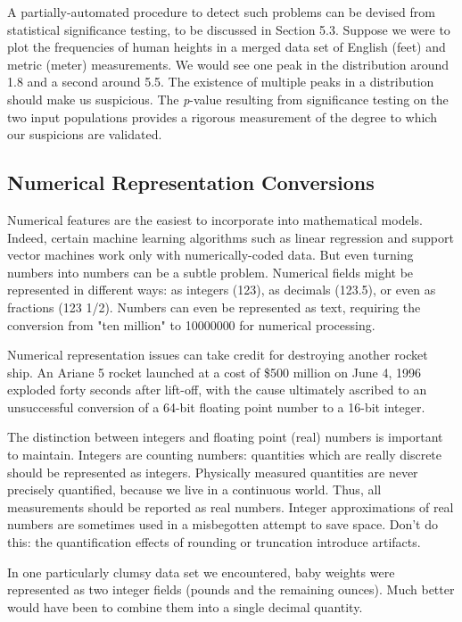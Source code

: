 \documentclass[10pt]{article}
\begin{document}
A partially-automated procedure to detect such problems can be devised from statistical significance testing, to be discussed in Section 5.3. Suppose we were to plot the frequencies of human heights in a merged data set of English (feet) and metric (meter) measurements. We would see one peak in the distribution around 1.8 and a second around 5.5. The existence of multiple peaks in a distribution should make us suspicious. The \emph{p}-value resulting from significance testing on the two input populations provides a rigorous measurement of the degree to which our suspicions are validated.

\subsection{Numerical Representation Conversions}
Numerical features are the easiest to incorporate into mathematical models. Indeed, certain machine learning algorithms such as linear regression and support vector machines work only with numerically-coded data. But even turning numbers into numbers can be a subtle problem. Numerical fields might be represented in different ways: as integers (123), as decimals (123.5), or even as fractions (123 1/2). Numbers can even be represented as text, requiring the conversion from "ten million" to 10000000 for numerical processing.

Numerical representation issues can take credit for destroying another rocket ship. An Ariane 5 rocket launched at a cost of \$500 million on June 4, 1996 exploded forty seconds after lift-off, with the cause ultimately ascribed to an unsuccessful conversion of a 64-bit floating point number to a 16-bit integer.

The distinction between integers and floating point (real) numbers is important to maintain. Integers are counting numbers: quantities which are really discrete should be represented as integers. Physically measured quantities are never precisely quantified, because we live in a continuous world. Thus, all measurements should be reported as real numbers. Integer approximations of real numbers are sometimes used in a misbegotten attempt to save space. Don't do this: the quantification effects of rounding or truncation introduce artifacts.

In one particularly clumsy data set we encountered, baby weights were represented as two integer fields (pounds and the remaining ounces). Much better would have been to combine them into a single decimal quantity.
\end{document}
